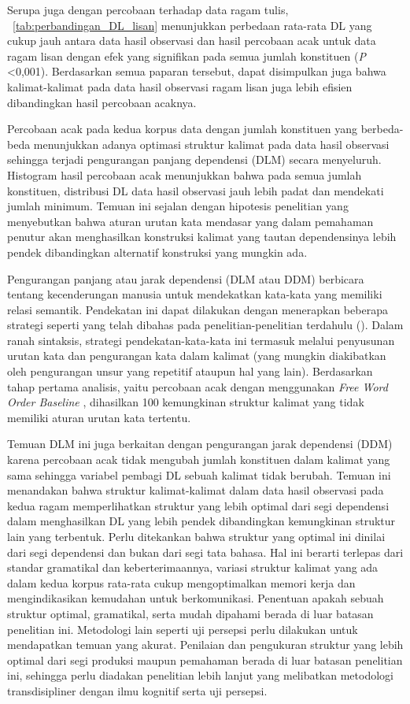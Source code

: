 Serupa juga dengan percobaan terhadap data ragam tulis, \tab~\ref{tab:perbandingan_DL_lisan} menunjukkan perbedaan rata-rata DL yang cukup jauh antara data hasil observasi dan hasil percobaan acak untuk data ragam lisan dengan efek yang signifikan pada semua jumlah konstituen (\textit{P} \textless 0,001). Berdasarkan semua paparan tersebut, dapat disimpulkan juga bahwa kalimat-kalimat pada data hasil observasi ragam lisan juga lebih efisien dibandingkan hasil percobaan acaknya.

Percobaan acak pada kedua korpus data dengan jumlah konstituen yang berbeda-beda menunjukkan adanya optimasi struktur kalimat pada data hasil observasi sehingga terjadi pengurangan panjang dependensi (DLM) secara menyeluruh. Histogram hasil percobaan acak menunjukkan bahwa pada semua jumlah konstituen, distribusi DL data hasil observasi jauh lebih padat dan mendekati jumlah minimum. Temuan ini sejalan dengan hipotesis penelitian \cite{hawkins2014cross} yang menyebutkan bahwa aturan urutan kata mendasar yang dalam pemahaman penutur akan menghasilkan konstruksi kalimat yang tautan dependensinya lebih pendek dibandingkan alternatif konstruksi yang mungkin ada.

Pengurangan panjang atau jarak dependensi (DLM atau DDM) berbicara tentang kecenderungan manusia untuk mendekatkan kata-kata yang memiliki relasi semantik. Pendekatan ini dapat dilakukan dengan menerapkan beberapa strategi seperti yang telah dibahas pada penelitian-penelitian terdahulu (\citealp{jaeger2006redundancy, gildea2015human}). Dalam ranah sintaksis, strategi pendekatan-kata-kata ini termasuk melalui penyusunan urutan kata dan pengurangan kata dalam kalimat (yang mungkin diakibatkan oleh pengurangan unsur yang repetitif ataupun hal yang lain). Berdasarkan tahap pertama analisis, yaitu percobaan acak dengan menggunakan \textit{Free Word Order Baseline} \citep{futrell2015large}, dihasilkan 100 kemungkinan struktur kalimat yang tidak memiliki aturan urutan kata tertentu. 

Temuan DLM ini juga berkaitan dengan pengurangan jarak dependensi (DDM) karena percobaan acak tidak mengubah jumlah konstituen dalam kalimat yang sama sehingga variabel pembagi DL sebuah kalimat tidak berubah. Temuan ini menandakan bahwa struktur kalimat-kalimat dalam data hasil observasi pada kedua ragam memperlihatkan struktur yang lebih optimal dari segi dependensi dalam menghasilkan DL yang lebih pendek dibandingkan kemungkinan struktur lain yang terbentuk. Perlu ditekankan bahwa struktur yang optimal ini dinilai dari segi dependensi dan bukan dari segi tata bahasa. Hal ini berarti terlepas dari standar gramatikal dan keberterimaannya, variasi struktur kalimat yang ada dalam kedua korpus rata-rata cukup mengoptimalkan memori kerja dan mengindikasikan kemudahan untuk berkomunikasi. Penentuan apakah sebuah struktur optimal, gramatikal, serta mudah dipahami berada di luar batasan penelitian ini. Metodologi lain seperti uji persepsi perlu dilakukan untuk mendapatkan temuan yang akurat. Penilaian dan pengukuran struktur yang lebih optimal dari segi produksi maupun pemahaman berada di luar batasan penelitian ini, sehingga perlu diadakan penelitian lebih lanjut yang melibatkan metodologi transdisipliner dengan ilmu kognitif serta uji persepsi.

